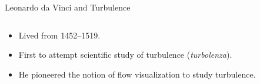 \begin{frame}{Leonardo da Vinci and Turbulence}

\setlength{\fboxsep}{0pt}
\setlength{\fboxrule}{1pt}
\begin{columns}[T]
    \begin{column}{.6\textwidth}
      \begin{minipage}[c][.6\textheight][c]{\linewidth}
      \begin{itemize}
      \item Lived from 1452--1519. 
      \item First to attempt scientific study of turbulence (\textit{turbolenza}). 
      \item He pioneered the notion of flow visualization to study turbulence. 
      \end{itemize}
      \end{minipage}
    \end{column}
    \begin{column}{.4\textwidth}
    \end{column}
  \end{columns}

\end{frame}


